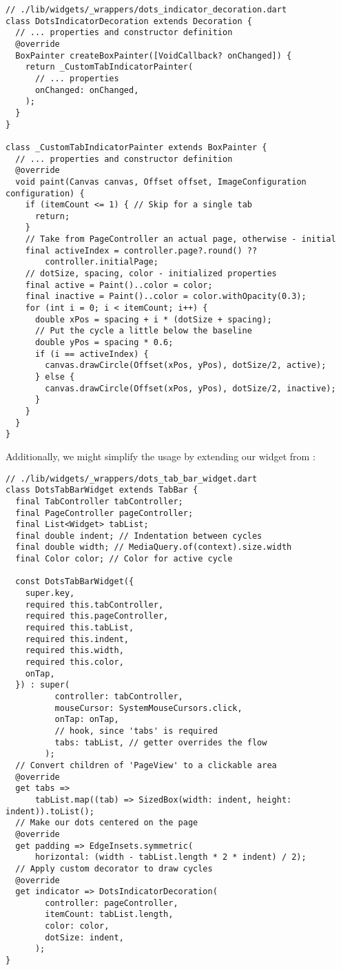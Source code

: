 \begin{lstlisting}
// ./lib/widgets/_wrappers/dots_indicator_decoration.dart
class DotsIndicatorDecoration extends Decoration {
  // ... properties and constructor definition
  @override
  BoxPainter createBoxPainter([VoidCallback? onChanged]) {
    return _CustomTabIndicatorPainter(
      // ... properties
      onChanged: onChanged,
    );
  }
}

class _CustomTabIndicatorPainter extends BoxPainter {
  // ... properties and constructor definition
  @override
  void paint(Canvas canvas, Offset offset, ImageConfiguration configuration) {
    if (itemCount <= 1) { // Skip for a single tab
      return;
    }
    // Take from PageController an actual page, otherwise - initial
    final activeIndex = controller.page?.round() ?? 
        controller.initialPage;
    // dotSize, spacing, color - initialized properties
    final active = Paint()..color = color;
    final inactive = Paint()..color = color.withOpacity(0.3);
    for (int i = 0; i < itemCount; i++) {
      double xPos = spacing + i * (dotSize + spacing);
      // Put the cycle a little below the baseline
      double yPos = spacing * 0.6; 
      if (i == activeIndex) {
        canvas.drawCircle(Offset(xPos, yPos), dotSize/2, active);
      } else {
        canvas.drawCircle(Offset(xPos, yPos), dotSize/2, inactive);
      }
    }
  }
}
\end{lstlisting}

\noindent Additionally, we might simplify the usage by extending our widget from :

\begin{lstlisting}
// ./lib/widgets/_wrappers/dots_tab_bar_widget.dart
class DotsTabBarWidget extends TabBar {
  final TabController tabController;
  final PageController pageController;
  final List<Widget> tabList;
  final double indent; // Indentation between cycles
  final double width; // MediaQuery.of(context).size.width
  final Color color; // Color for active cycle

  const DotsTabBarWidget({
    super.key,
    required this.tabController,
    required this.pageController,
    required this.tabList,
    required this.indent,
    required this.width,
    required this.color,
    onTap,
  }) : super(
          controller: tabController,
          mouseCursor: SystemMouseCursors.click,
          onTap: onTap,
          // hook, since 'tabs' is required
          tabs: tabList, // getter overrides the flow
        );
  // Convert children of 'PageView' to a clickable area 
  @override
  get tabs =>
      tabList.map((tab) => SizedBox(width: indent, height: indent)).toList();
  // Make our dots centered on the page
  @override
  get padding => EdgeInsets.symmetric(
      horizontal: (width - tabList.length * 2 * indent) / 2);
  // Apply custom decorator to draw cycles
  @override
  get indicator => DotsIndicatorDecoration(
        controller: pageController,
        itemCount: tabList.length,
        color: color,
        dotSize: indent,
      );
}
\end{lstlisting}
